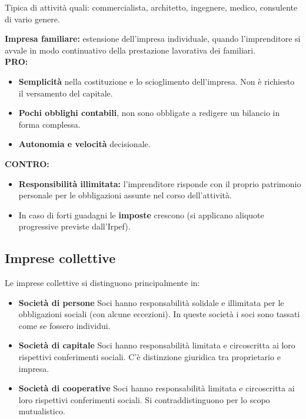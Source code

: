 \documentclass[../main.tex]{subfiles}
\begin{document}
Tipica di attività quali: commercialista, architetto, ingegnere, medico, consulente di vario genere.

\textbf{Impresa familiare:} estensione dell'impresa individuale, quando l'imprenditore si avvale in modo continuativo della prestazione lavorativa dei familiari. \\

\textbf{PRO:}
\begin{itemize}
\item \textbf{Semplicità} nella costituzione e lo scioglimento dell'impresa. Non è richiesto il versamento del capitale.

\item \textbf{Pochi obblighi contabili}, non sono obbligate a redigere un bilancio in forma complessa.

\item \textbf{Autonomia e velocità} decisionale.
\end{itemize}

\textbf{CONTRO:}
\begin{itemize}
\item \textbf{Responsibilità illimitata:} l'imprenditore risponde con il proprio patrimonio personale per le obbligazioni assunte nel corso dell'attività.

\item In caso di forti guadagni le \textbf{imposte} crescono (si applicano aliquote progressive previste dall'Irpef).

\end{itemize}

\subsection{Imprese collettive}

Le imprese collettive si distinguono principalmente in:

\begin{itemize}
\item \textbf{Società di persone}
Soci hanno responsabilità solidale e illimitata per le obbligazioni sociali (con alcune eccezioni). In queste società i soci sono tassati come se fossero individui.

\item \textbf{Società di capitale}
Soci hanno responsabilità limitata e circoscritta ai loro rispettivi conferimenti sociali.
C'è distinzione giuridica tra proprietario e impresa.

\item \textbf{Società di cooperative} Soci hanno responsabilità limitata e circoscritta ai loro rispettivi conferimenti sociali.
Si contraddistinguono per lo scopo mutualistico.
\end{itemize}
\end{document}
